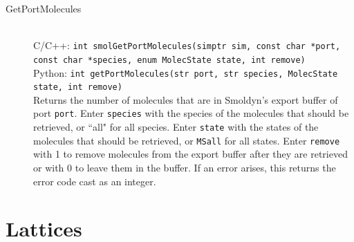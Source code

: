 \documentclass {scrbook}
\newcommand {\ttt} {\texttt}
\begin{document}
\begin{description}
\item[GetPortMolecules]
\hfill \\
C/C++: \ttt{int smolGetPortMolecules(simptr sim, const char *port, const char *species, enum MolecState state, int remove)}\\
Python: \ttt{int getPortMolecules(str port, str species, MolecState state, int remove)}\\
Returns the number of molecules that are in Smoldyn's export buffer of port \ttt{port}. Enter \ttt{species} with the species of the molecules that should be retrieved, or ``all" for all species. Enter \ttt{state} with the states of the molecules that should be retrieved, or \ttt{MSall} for all states. Enter \ttt{remove} with 1 to remove molecules from the export buffer after they are retrieved or with 0 to leave them in the buffer. If an error arises, this returns the error code cast as an integer.

\end{description}


\section{Lattices}
\end{document}
